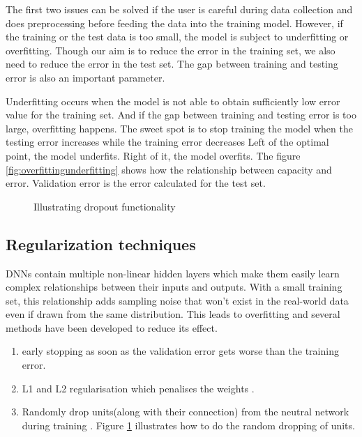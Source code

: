 The first two issues can be solved if the user is careful during data collection and does
preprocessing before feeding the data into the training model. However, if the training or
the test data is too small, the model is subject to underfitting or overfitting. Though
our aim is to reduce the error in the training set, we also need to reduce the error in
the test set. The gap between training and testing error is also an important parameter.

Underfitting occurs when the model is not able to obtain sufficiently low error value for
the training set. And if the gap between training and testing error is too large,
overfitting happens. The sweet spot is to stop training the model when the testing error
increases while the training error  decreases
 \label{inside:formodelcheckpoint} Left of the optimal point, the model underfits. Right of
it, the model overfits. The figure \ref{fig:overfittingunderfitting} shows how the
relationship between capacity and error. Validation error is the error calculated for the test set.

\begin{figure}[h]
	\centering
    \def\svgwidth{0.6\textwidth}
    
    \caption{Illustrating dropout functionality}
    \label{fig:Dropout_function}
\end{figure}

\subsection{Regularization techniques}
DNNs contain multiple non-linear hidden layers which make them easily learn
complex relationships between their inputs and outputs. With a small training set, this
relationship adds sampling noise that won't exist in the real-world data even if drawn
from the same distribution. This leads to overfitting and several methods have been
developed to reduce its effect.
\begin{enumerate}
    \item early stopping as soon as the validation error gets worse than the training
        error. \label{item:earlystopping}
    \item L1 and L2 regularisation which penalises the weights \cite{Schmidhuber_2015}.
    \item Randomly drop units(along with their connection) from the neutral network during
        training \cite{dropoutpaper}. Figure \ref{fig:Dropout_function} illustrates how to
        do the random dropping of units.
\end{enumerate}



